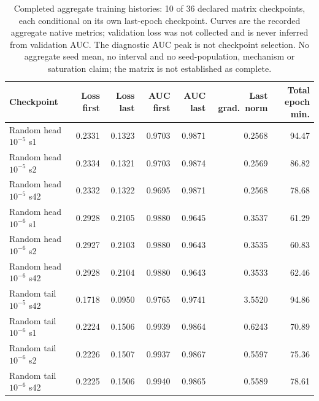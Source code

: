 \begin{table}[!t]
\caption{Completed aggregate training histories: 10 of 36 declared matrix checkpoints, each conditional on its own last-epoch checkpoint. Curves are the recorded aggregate native metrics; validation loss was not collected and is never inferred from validation AUC. The diagnostic AUC peak is not checkpoint selection. No aggregate seed mean, no interval and no seed-population, mechanism or saturation claim; the matrix is not established as complete.}
\label{tab:strong-history-v1}
\centering\scriptsize
\begin{tabular}{@{}lrrrrrr@{}}
\toprule
Checkpoint & Loss first & Loss last & AUC first & AUC last & Last grad.\ norm & Total epoch min. \\
\midrule
Random head $10^{-5}$ s1 & 0.2331 & 0.1323 & 0.9703 & 0.9871 & 0.2568 & 94.47 \\
Random head $10^{-5}$ s2 & 0.2334 & 0.1321 & 0.9703 & 0.9874 & 0.2569 & 86.82 \\
Random head $10^{-5}$ s42 & 0.2332 & 0.1322 & 0.9695 & 0.9871 & 0.2568 & 78.68 \\
Random head $10^{-6}$ s1 & 0.2928 & 0.2105 & 0.9880 & 0.9645 & 0.3537 & 61.29 \\
Random head $10^{-6}$ s2 & 0.2927 & 0.2103 & 0.9880 & 0.9643 & 0.3535 & 60.83 \\
Random head $10^{-6}$ s42 & 0.2928 & 0.2104 & 0.9880 & 0.9643 & 0.3533 & 62.46 \\
Random tail $10^{-5}$ s42 & 0.1718 & 0.0950 & 0.9765 & 0.9741 & 3.5520 & 94.86 \\
Random tail $10^{-6}$ s1 & 0.2224 & 0.1506 & 0.9939 & 0.9864 & 0.6243 & 70.89 \\
Random tail $10^{-6}$ s2 & 0.2226 & 0.1507 & 0.9937 & 0.9867 & 0.5597 & 75.36 \\
Random tail $10^{-6}$ s42 & 0.2225 & 0.1506 & 0.9940 & 0.9865 & 0.5589 & 78.61 \\
\bottomrule
\end{tabular}
\end{table}
